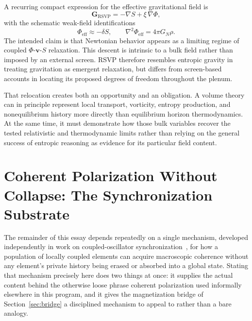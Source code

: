\documentclass[11pt]{article}
\begin{document}
A recurring compact expression for the effective gravitational field is
\[
\mathbf{G}_{\mathrm{RSVP}}=-\nabla S+\xi\,\nabla\Phi,
\]
with the schematic weak-field identifications
\[
\Phi_{\mathrm{eff}}\approx-\delta S,
\qquad
\nabla^2\Phi_{\mathrm{eff}}=4\pi G_N\rho.
\]
The intended claim is that Newtonian behavior appears as a limiting regime of coupled $\Phi$-$\mathbf{v}$-$S$ relaxation. This descent is intrinsic to a bulk field rather than imposed by an external screen. RSVP therefore resembles entropic gravity in treating gravitation as emergent relaxation, but differs from screen-based accounts in locating its proposed degrees of freedom throughout the plenum.

That relocation creates both an opportunity and an obligation. A volume theory can in principle represent local transport, vorticity, entropy production, and nonequilibrium history more directly than equilibrium horizon thermodynamics. At the same time, it must demonstrate how those bulk variables recover the tested relativistic and thermodynamic limits rather than relying on the general success of entropic reasoning as evidence for its particular field content.

\section{Coherent Polarization Without Collapse: The Synchronization Substrate}
\label{sec:synchronization}

The remainder of this essay depends repeatedly on a single mechanism, developed independently in work on coupled-oscillator synchronization~\cite{kuramoto1984,strogatz2000,acebron2005}, for how a population of locally coupled elements can acquire macroscopic coherence without any element's private history being erased or absorbed into a global state. Stating that mechanism precisely here does two things at once: it supplies the actual content behind the otherwise loose phrase coherent polarization used informally elsewhere in this program, and it gives the magnetization bridge of Section~\ref{sec:bridge} a disciplined mechanism to appeal to rather than a bare analogy.
\end{document}

